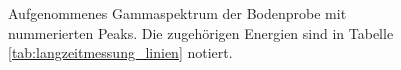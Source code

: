 \documentclass[11pt, a4paper]{article}
\numberwithin{equation}{section}
\begin{document}
\begin{appendix}
\begin{figure}
		\centering
		
		\caption{Aufgenommenes Gammaspektrum der Bodenprobe mit nummerierten Peaks. Die zugehörigen Energien sind in Tabelle \ref{tab:langzeitmessung_linien} notiert.}
		\label{fig:langzeit_gross}
\end{figure}

\end{appendix}
\end{document}
